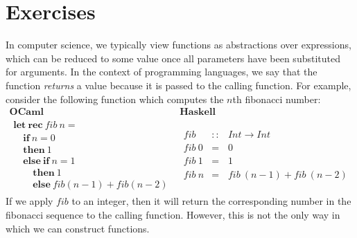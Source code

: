 \documentclass[10pt,a4paper]{exam} %
\begin{document}
\section*{Exercises}

\begin{questions}
    \question In computer science, we typically view functions as abstractions over expressions, which can be reduced to some value once all parameters have been substituted for arguments. In the context of programming languages, we say that the function \emph{returns} a value because it is passed to the calling function. For example, consider the following function which computes the $n$th fibonacci number:
    \begin{displaymath}
    \begin{array}{c|c}
    \textbf{OCaml} & \textbf{Haskell} \\ \hline
    \begin{array}{l}
    \mathbf{let}~\mathbf{rec}~\mathit{fib}~n = \\
    \quad \mathbf{if}~n=0 \\
    \quad \mathbf{then}~1 \\
    \quad \mathbf{else}~\mathbf{if}~n=1 \\
    \qquad \mathbf{then}~1 \\
    \qquad \mathbf{else}~\mathit{fib}(n-1) + \mathit{fib}(n-2)
    \end{array} &
    \begin{array}{lcl}
    \mathit{fib} & :: & \mathit{Int} \to \mathit{Int} \\
    \mathit{fib}~0 & = & 0 \\
    \mathit{fib}~1 & = & 1 \\
    \mathit{fib}~n & = & \mathit{fib}~(n-1) + \mathit{fib}~(n-2)
    \end{array}
    \end{array}
    \end{displaymath}
    If we apply $\mathit{fib}$ to an integer, then it will return the corresponding number in the fibonacci sequence to the calling function. However, this is not the only way in which we can construct functions.
    

\end{questions}
\end{document}
